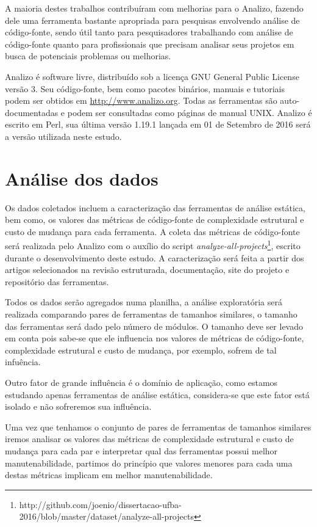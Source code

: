 A maioria destes trabalhos contribuíram com melhorias para o Analizo, fazendo
dele uma ferramenta bastante apropriada para pesquisas envolvendo análise de código-fonte,
sendo útil tanto para pesquisadores trabalhando com análise de código-fonte
quanto para profissionais que precisam analisar seus projetos em busca de
potenciais problemas ou melhorias.

Analizo é software livre, distribuído sob a licença GNU General Public License
versão 3. Seu código-fonte, bem como pacotes binários, manuais e tutoriais
podem ser obtidos em \url{http://www.analizo.org}. Todas as ferramentas são
auto-documentadas e podem ser consultadas como páginas de manual UNIX. Analizo
é escrito em Perl, sua última versão 1.19.1 lançada em 01 de Setembro de 2016
será a versão utilizada neste estudo.

\section{Análise dos dados} \label{analise}

Os dados coletados incluem a caracterização das ferramentas de análise
estática, bem como, os valores das métricas de código-fonte de complexidade
estrutural e custo de mudança para cada ferramenta. A coleta das métricas de
código-fonte será realizada pelo Analizo com o auxílio do script {\em
analyze-all-projects}\footnote{http://github.com/joenio/dissertacao-ufba-2016/blob/master/dataset/analyze-all-projects},
escrito durante o desenvolvimento deste estudo. A caracterização será feita a
partir dos artigos selecionados na revisão estruturada, documentação, site do
projeto e repositório das ferramentas.

Todos os dados serão agregados numa planilha, a análise exploratória será
realizada comparando pares de ferramentas de tamanhos similares, o tamanho das
ferramentas será dado pelo número de módulos. O tamanho deve ser
levado em conta pois sabe-se que ele influencia nos valores de métricas de
código-fonte, complexidade estrutural e custo de mudança, por exemplo, sofrem
de tal infuência.

Outro fator de grande influência é o domínio de aplicação, como estamos
estudando apenas ferramentas de análise estática, considera-se que este fator
está isolado e não sofreremos sua influência.

Uma vez que tenhamos o conjunto de pares de ferramentas de tamanhos similares
iremos analisar os valores das métricas de complexidade estrutural e custo de
mudança para cada par e interpretar qual das ferramentas possui melhor
manutenabilidade, partimos do princípio que valores menores para cada uma
destas métricas implicam em melhor manutenabilidade.

